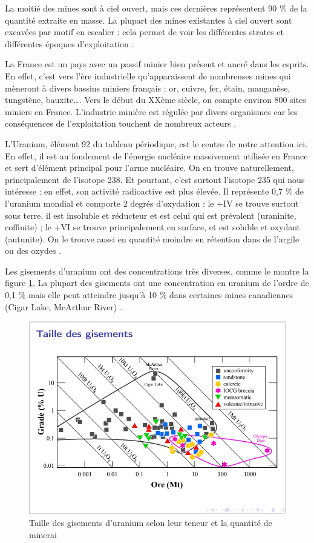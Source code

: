 \documentclass{article}
\begin{document}
La moitié des mines sont à ciel ouvert, mais ces dernières représentent 90 \% de la quantité extraite en masse. La plupart des mines existantes à ciel ouvert sont excavées par motif en escalier : cela permet de voir les différentes strates et différentes époques d’exploitation \cite{raimbault_mine_2020}.

La France est un pays avec un passif minier bien présent et ancré dans les esprits. En effet, c’est vers l’ère industrielle qu’apparaissent de nombreuses mines qui mèneront à divers bassins miniers français : or, cuivre, fer, étain, manganèse, tungstène, bauxite…. Vers le début du XXème siècle, on compte environ 800 sites miniers en France. L’industrie minière est régulée par divers organismes car les conséquences de l’exploitation touchent de nombreux acteurs \cite{ledoux_notions_2020}.

L’Uranium, élément 92 du tableau périodique, est le centre de notre attention ici. En effet, il est au fondement de l’énergie nucléaire massivement utilisée en France et sert d’élément principal pour l’arme nucléaire. On en trouve naturellement, principalement de l’isotope 238. Et pourtant, c’est surtout l’isotope 235 qui nous intéresse : en effet, son activité radioactive est plus élevée. Il représente 0,7 \% de l’uranium mondial et comporte 2 degrés d’oxydation : le +IV se trouve surtout sous terre, il est insoluble et réducteur et est celui qui est prévalent (uraninite, coffinite) ; le +VI se trouve principalement en surface, et est soluble et oxydant (autunite). On le trouve aussi en quantité moindre en rétention dans de l’argile ou des oxydes \cite{descostes_introduction_2020}.

Les gisements d’uranium ont des concentrations très diverses, comme le montre la figure \ref{fig:gisements_uranium}. La plupart des gisements ont une concentration en uranium de l’ordre de 0,1 \% mais elle peut atteindre jusqu’à 10 \% dans certaines mines canadiennes (Cigar Lake, McArthur River) \cite{raimbault_mine_2020}.


\begin{figure}[!h]
    \centering
    \includegraphics[width = \linewidth]{I_A_1.jpg}
    \caption{Taille des gisements d'uranium selon leur teneur et la quantité de minerai}
    \label{fig:gisements_uranium}
\end{figure}
\end{document}

